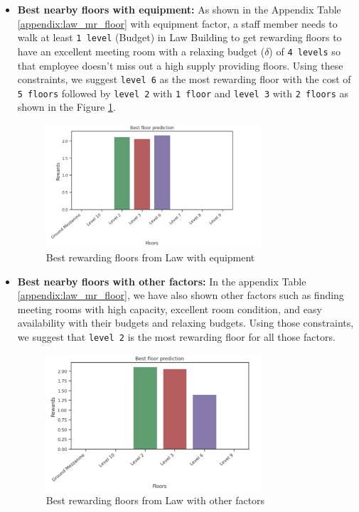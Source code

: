 \begin{itemize}
\item \textbf{Best nearby floors with equipment:} As shown in the Appendix Table \ref{appendix:law_mr_floor} with equipment factor, a staff member needs to walk at least \texttt{1 level} (Budget) in Law  Building to get rewarding floors to have an excellent meeting room with a relaxing budget ($\delta$) of \texttt{4 levels} so that employee doesn't miss out a high supply providing floors. Using these constraints, we suggest \texttt{level 6} as the most rewarding floor with the cost of \texttt{5 floors} followed by \texttt{level 2} with \texttt{1 floor} and \texttt{level 3} with \texttt{2 floors} as shown in the Figure \ref{fig:law-floor-equipment}.

\begin{figure}[H]
\centering
  \includegraphics[width=8cm]{content/results/floors/plots/law-floor-equipment.png}
\caption{Best rewarding floors from Law with equipment}
\label{fig:law-floor-equipment}
\end{figure}

\item \textbf{Best nearby floors with other factors:} In the appendix Table \ref{appendix:law_mr_floor}, we have also shown other factors such as finding meeting rooms with high capacity, excellent room condition, and easy availability with their budgets and relaxing budgets. Using those constraints, we suggest that \texttt{level 2} is the most rewarding floor for all those factors.

\begin{figure}[H]
\centering
  \includegraphics[width=8cm]{content/results/floors/plots/law-floor-capacity.png}
\caption{Best rewarding floors from Law with other factors}
\label{fig:law-floor-capacity}
\end{figure}

\end{itemize}


